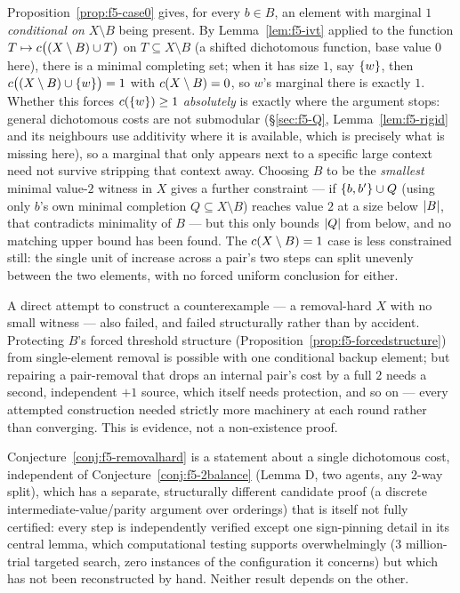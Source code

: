 \begin{remark}
\label{rem:f5-gap}
Proposition~\ref{prop:f5-case0} gives, for every $b \in B$, an element with
marginal $1$ \emph{conditional on} $X \setminus B$ being present. By
Lemma~\ref{lem:f5-ivt} applied to the function
$T \mapsto c\bigl((X\setminus B)\cup T\bigr)$ on $T \subseteq X \setminus B$
(a shifted dichotomous function, base value $0$ here), there is a minimal
completing set; when it has size $1$, say $\left\{w\right\}$, then
$c\bigl((X\setminus B)\cup \left\{w\right\}\bigr) = 1$ with $c(X \setminus B) = 0$,
so $w$'s marginal there is exactly $1$. Whether this forces
$c(\left\{w\right\}) \ge 1$ \emph{absolutely} is exactly where the argument stops:
general dichotomous costs are not submodular (\S\ref{sec:f5-Q},
Lemma~\ref{lem:f5-rigid} and its neighbours use additivity where it is
available, which is precisely what is missing here), so a marginal that only
appears next to a specific large context need not survive stripping that
context away. Choosing $B$ to be the \emph{smallest} minimal value-$2$ witness
in $X$ gives a further constraint --- if $\left\{b,b'\right\} \cup Q$ (using only $b$'s
own minimal completion $Q \subseteq X\setminus B$) reaches value $2$ at a size
below $\left\lvert B\right\rvert$, that contradicts minimality of $B$ --- but this only bounds
$\left\lvert Q\right\rvert$ from below, and no matching upper bound has been found. The
$c(X \setminus B) = 1$ case is less constrained still: the single unit of
increase across a pair's two steps can split unevenly between the two
elements, with no forced uniform conclusion for either.

A direct attempt to construct a counterexample --- a removal-hard $X$ with no
small witness --- also failed, and failed structurally rather than by
accident. Protecting $B$'s forced threshold structure
(Proposition~\ref{prop:f5-forcedstructure}) from single-element removal is
possible with one conditional backup element; but repairing a pair-removal
that drops an internal pair's cost by a full $2$ needs a second, independent
$+1$ source, which itself needs protection, and so on --- every attempted
construction needed strictly more machinery at each round rather than
converging. This is evidence, not a non-existence proof.
\end{remark}

\begin{remark}
\label{rem:f5-2move-vs-lemmaD}
Conjecture~\ref{conj:f5-removalhard} is a statement about a single dichotomous
cost, independent of Conjecture~\ref{conj:f5-2balance} (Lemma D, two agents,
any $2$-way split), which has a separate, structurally different candidate
proof (a discrete intermediate-value/parity argument over orderings) that is
itself not fully certified: every step is independently verified except one
sign-pinning detail in its central lemma, which computational testing
supports overwhelmingly ($3$ million-trial targeted search, zero instances of
the configuration it concerns) but which has not been reconstructed by hand.
Neither result depends on the other.
\end{remark}

